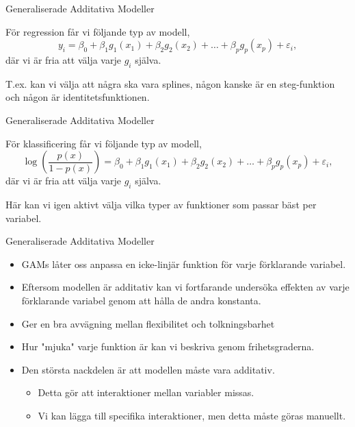 \documentclass[10pt,english]{beamer}
\begin{document}
\begin{frame}{Generaliserade Additativa Modeller}
    
    För regression får vi följande typ av modell,
    \begin{equation*}
        y_i = \beta_0 + \beta_1 g_1(x_1) + \beta_2 g_2(x_2) + \ldots + \beta_p g_p(x_p) + \varepsilon_i,
    \end{equation*}
    där vi är fria att välja varje $g_i$ själva.

    T.ex. kan vi välja att några ska vara splines, någon kanske är en steg-funktion och någon är identitetsfunktionen.

\end{frame}

\begin{frame}{Generaliserade Additativa Modeller}
    
    För klassificering får vi följande typ av modell,
    \begin{equation*}
        \log\left(\frac{p(x)}{1 - p(x)}\right) = \beta_0 + \beta_1 g_1(x_1) + \beta_2 g_2(x_2) + \ldots + \beta_p g_p(x_p) + \varepsilon_i,
    \end{equation*}
    där vi är fria att välja varje $g_i$ själva.

    Här kan vi igen aktivt välja vilka typer av funktioner som passar bäst per variabel.

\end{frame}

\begin{frame}{Generaliserade Additativa Modeller}
    
    \begin{itemize}
        \item GAMs låter oss anpassa en icke-linjär funktion för varje förklarande variabel.
        \item Eftersom modellen är additativ kan vi fortfarande undersöka effekten av varje förklarande variabel genom att hålla de andra konstanta.
        \item Ger en bra avvägning mellan flexibilitet och tolkningsbarhet
        \item Hur "mjuka" varje funktion är kan vi beskriva genom frihetsgraderna. 
        \item Den största nackdelen är att modellen måste vara additativ.
        \begin{itemize}
            \item Detta gör att interaktioner mellan variabler missas.
            \item Vi kan lägga till specifika interaktioner, men detta måste göras manuellt.
        \end{itemize}
    \end{itemize}

\end{frame}
\end{document}
